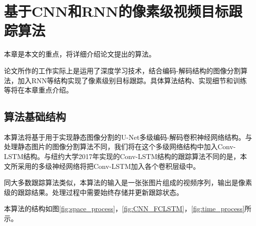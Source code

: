 
\chapter{基于CNN和RNN的像素级视频目标跟踪算法} \label{section:chap4}
本章是本文的重点，将详细介绍论文提出的算法。
\par
论文所作的工作实际上是运用了深度学习技术，结合编码-解码结构的图像分割算法，加入RNN等结构实现了像素级别目标跟踪。具体算法结构、实现细节和训练等将在本章重点介绍。

\section{算法基础结构}
本算法将基于用于实现静态图像分割的U-Net\supercite{ronneberger2015u}多级编码-解码卷积神经网络结构。与处理静态图片的图像分割算法不同，我们将在这个多级网络结构中加入Conv-LSTM结构。与纽约大学2017年实现的Conv-LSTM结构的跟踪算法不同的是，本文所采用的多级神经网络将把Conv-LSTM加入各个卷积层级中。
\par
同大多数跟踪算法类似，本算法的输入是一张张图片组成的视频序列，输出是像素级的跟踪结果。处理过程中需要始终存储并更新跟踪状态。
\par
本算法的结构如图\ref{fig:space_process}，\ref{fig:CNN_FCLSTM}，\ref{fig:time_process}所示。


